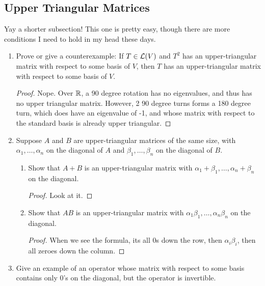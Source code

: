 \subsection{Upper Triangular Matrices}

Yay a shorter subsection! This one is pretty easy, though there are more conditions I need to hold in my head these days.

\begin{enumerate}

    \item[1] Prove or give a counterexample: If $T \in \mathcal L(V)$ and $T^2$ has an upper-triangular matrix with respect to some basis of $V$, then $T$ has an upper-triangular matrix with respect to some basis of $V$.
    
    \begin{proof}
        Nope. Over $\mathbb{R}$, a 90 degree rotation has no eigenvalues, and thus has no upper triangular matrix. However, 2 90 degree turns forms a 180 degree turn, which does have an eigenvalue of -1, and whose matrix with respect to the standard basis is already upper triangular.
    \end{proof}

    \item[2] Suppose $A$ and $B$ are upper-triangular matrices of the same size, with $\alpha_1, \dots, \alpha_n$ on the diagonal of $A$ and $\beta_1, \dots, \beta_n$ on the diagonal of $B$. 
    
    \begin{enumerate}
        \item Show that $A + B$ is an upper-triangular matrix with $\alpha_1 + \beta_1, \dots, \alpha_n + \beta_n$ on the diagonal. 
        
        \begin{proof}
            Look at it.
        \end{proof}
        
        \item Show that $AB$ is an upper-triangular matrix with $\alpha_1\beta_1, \dots, \alpha_n\beta_n$ on the diagonal.
        
        \begin{proof}
            When we see the formula, its all 0s down the row, then $\alpha_i\beta_i$, then all zeroes down the column.
        \end{proof}
    \end{enumerate}

    \item[4] Give an example of an operator whose matrix with respect to some basis
contains only 0’s on the diagonal, but the operator is invertible.


\end{enumerate}
